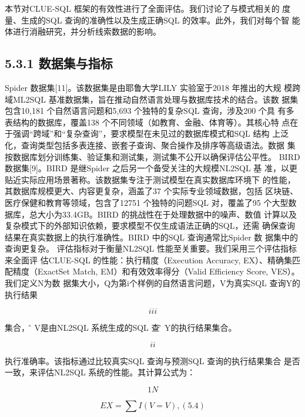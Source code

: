 \documentclass[12pt,a4paper,openright,UTF8]{ctexbook}
\begin{document}
本节对CLUE-SQL 框架的有效性进行了全面评估。我们讨论了与模式相关的 度量、生成的SQL 查询的准确性以及生成正确SQL 的效率。此外，我们对每个智 能体进行消融研究，并分析线索数据的影响。

\subsection{5.3.1 数据集与指标}

Spider 数据集[11]。该数据集是由耶鲁大学LILY 实验室于2018 年推出的大规 模跨域ML2SQL 基准数据集，旨在推动自然语言处理与数据库技术的结合。该数 据集包含10,181 个自然语言问题和5,693 个独特的复杂SQL 查询，涉及200 个具 有多表结构的数据库，覆盖138 个不同领域（如教育、金融、体育等）。其核心特 点在于强调“跨域”和“复杂查询”，要求模型在未见过的数据库模式和SQL 结构 上泛化，查询类型包括多表连接、嵌套子查询、聚合操作及排序等高级语法。数据 集按数据库划分训练集、验证集和测试集，测试集不公开以确保评估公平性。 BIRD 数据集[9]。BIRD 是继Spider 之后另一个备受关注的大规模NL2SQL 基 准，以更贴近实际应用场景著称。该数据集专注于测试模型在真实数据库环境下 的性能，其数据库规模更大、内容更复杂，涵盖了37 个实际专业领域数据，包括 区块链、医疗保健和教育等领域，包含了12751 个独特的问题SQL 对，覆盖了95 个大型数据库，总大小为33.4GB。BIRD 的挑战性在于处理数据中的噪声、数值 计算以及复杂模式下的外部知识依赖，要求模型不仅生成语法正确的SQL，还需 确保查询结果在真实数据上的执行准确性。BIRD 中的SQL 查询通常比Spider 数 据集中的查询更复杂。 评估指标对于衡量NL2SQL 性能至关重要。我们采用三个评估指标来全面评 估CLUE-SQL 的性能：执行精度（Execution Accuracy, EX）、精确集匹配精度（ExactSet Match, EM）和有效效率得分（Valid Efficiency Score, VES）。我们定义N为数 据集大小，Q为第i个样例的自然语言问题，V为真实SQL 查询Y的执行结果

\begin{equation*}
iii
\end{equation*}

集合，而̂ V是由NL2SQL 系统生成的SQL 查询̂ Y的执行结果集合。

\begin{equation*}
ii
\end{equation*}

执行准确率。该指标通过比较真实SQL 查询与预测SQL 查询的执行结果集合 是否一致，来评估NL2SQL 系统的性能。其计算公式为：

\begin{equation*}
1N
\end{equation*}

\begin{equation*}
EX =\sum I(V= V) ,(5.4)
\end{equation*}
\end{document}
